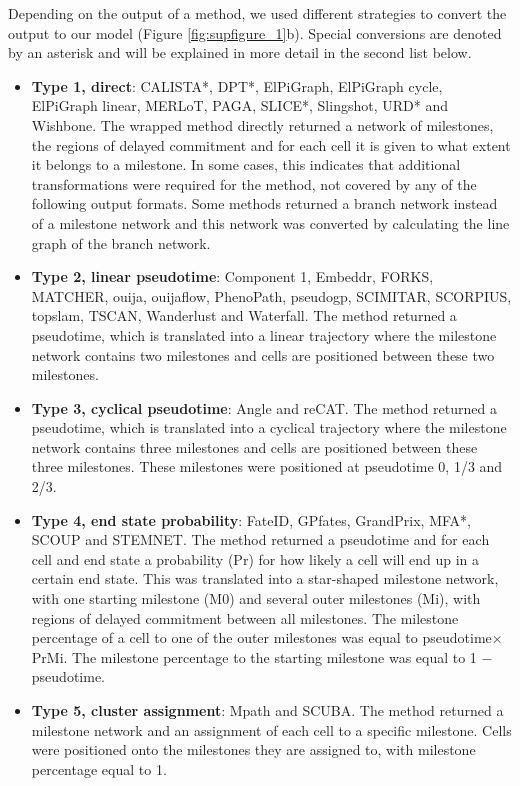 Depending on the output of a method, we used different strategies to convert the output to our model (Figure \ref{fig:supfigure_1}b). Special conversions are denoted by an asterisk and will be explained in more detail in the second list below.



\begin{itemize}
	\item \textbf{Type 1, direct}: CALISTA*, DPT*, ElPiGraph, ElPiGraph cycle, ElPiGraph linear, MERLoT, PAGA, SLICE*, Slingshot, URD* and Wishbone. The wrapped method directly returned a network of milestones, the regions of delayed commitment and for each cell it is given to what extent it belongs to a milestone. In some cases, this indicates that additional transformations were required for the method, not covered by any of the following output formats. Some methods returned a branch network instead of a milestone network and this network was converted by calculating the line graph of the branch network.
	\item \textbf{Type 2, linear pseudotime}: Component 1, Embeddr, FORKS, MATCHER, ouija, ouijaflow, PhenoPath, pseudogp, SCIMITAR, SCORPIUS, topslam, TSCAN, Wanderlust and Waterfall. The method returned a pseudotime, which is translated into a linear trajectory where the milestone network contains two milestones and cells are positioned between these two milestones.
	\item \textbf{Type 3, cyclical pseudotime}: Angle and reCAT. The method returned a pseudotime, which is translated into a cyclical trajectory where the milestone network contains three milestones and cells are positioned between these three milestones. These milestones were positioned at pseudotime 0, 1/3 and 2/3.
	\item \textbf{Type 4, end state probability}: FateID, GPfates, GrandPrix, MFA*, SCOUP and STEMNET. The method returned a pseudotime and for each cell and end state a probability (Pr) for how likely a cell will end up in a certain end state. This was translated into a star-shaped milestone network, with one starting milestone (M0) and several outer milestones (Mi), with regions of delayed commitment between all milestones. The milestone percentage of a cell to one of the outer milestones was equal to pseudotime$\times$PrMi. The milestone percentage to the starting milestone was equal to 1 $-$ pseudotime.
	\item \textbf{Type 5, cluster assignment}: Mpath and SCUBA. The method returned a milestone network and an assignment of each cell to a specific milestone. Cells were positioned onto the milestones they are assigned to, with milestone percentage equal to 1.

\end{itemize}
